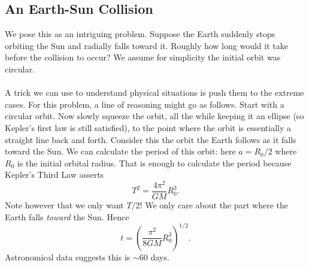 \subsection{An Earth-Sun Collision}
We pose this as an intriguing problem.
\prob Suppose the Earth suddenly stops orbiting the Sun and radially falls toward it. Roughly how long would it take before the collision to occur? We assume for simplicity the initial orbit was circular. \cite{Morin}\\
\\
A trick we can use to understand physical situations is push them to the extreme cases. For this problem, a line of reasoning might go as follows. Start with a circular orbit. Now slowly squeeze the orbit, all the while keeping it an ellipse (so Kepler's first law is still satisfied), to the point where the orbit is essentially a straight line back and forth. Consider this the orbit the Earth follows as it falls toward the Sun. We can calculate the period of this orbit: here $a = R_0/2$ where $R_0$ is the initial orbital radius. That is enough to calculate the period because Kepler's Third Law asserts 
\begin{equation}
    T^2 = \frac{4\pi^2}{GM}R_0^3.
\end{equation}
Note however that we only want $T/2$! We only care about the part where the Earth falls \textit{toward} the Sun. Hence
\begin{equation}
    t = \left(\frac{\pi^2}{8GM}R_0^3\right)^{1/2}.
\end{equation}
Astronomical data suggests this is $\sim 60$ days.

